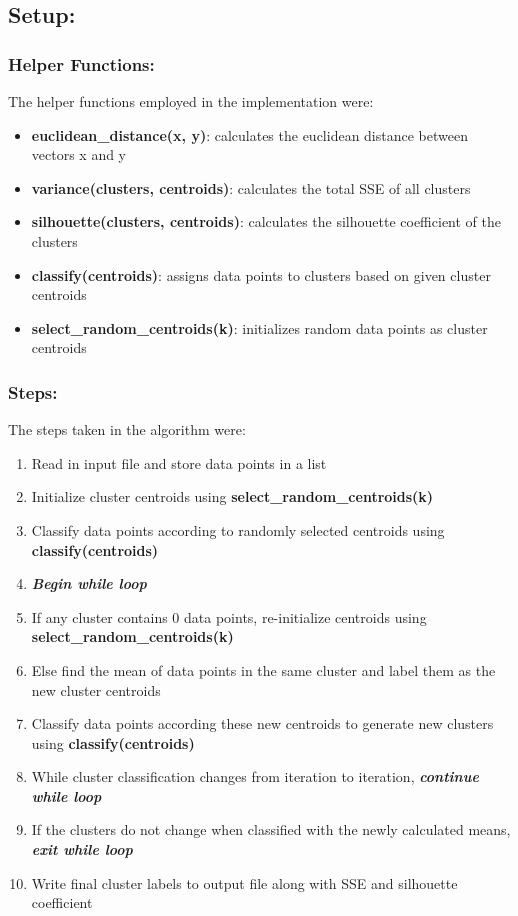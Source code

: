 \documentclass{article}
\begin{document}
\subsection{Setup:}
\subsubsection{Helper Functions:}
The helper functions employed in the implementation were:
\begin{itemize}
    \item \textbf{euclidean\_distance(x, y)}: calculates the euclidean distance between vectors x and y
    \item \textbf{variance(clusters, centroids)}: calculates the total SSE of all clusters
    \item \textbf{silhouette(clusters, centroids)}: calculates the silhouette coefficient of the clusters
    \item \textbf{classify(centroids)}: assigns data points to clusters based on given cluster centroids
    \item \textbf{select\_random\_centroids(k)}: initializes random data points as cluster centroids
\end{itemize}

\subsubsection{Steps:}
The steps taken in the algorithm were:
\begin{enumerate}
    \item Read in input file and store data points in a list
    \item Initialize cluster centroids using \textbf{select\_random\_centroids(k)}
    \item Classify data points according to randomly selected centroids using \textbf{classify(centroids)}
    \item \textit{\textbf{Begin while loop}}
    \item If any cluster contains 0 data points, re-initialize centroids using \textbf{select\_random\_centroids(k)}
    \item Else find the mean of data points in the same cluster and label them as the new cluster centroids
    \item Classify data points according these new centroids to generate new clusters using \textbf{classify(centroids)}
    \item While cluster classification changes from iteration to iteration, \textbf{\textit{continue while loop}}
    \item If the clusters do not change when classified with the  newly calculated means, \textbf{\textit{exit while loop}}
    \item Write final cluster labels to output file along with SSE and silhouette coefficient
\end{enumerate}
\end{document}
